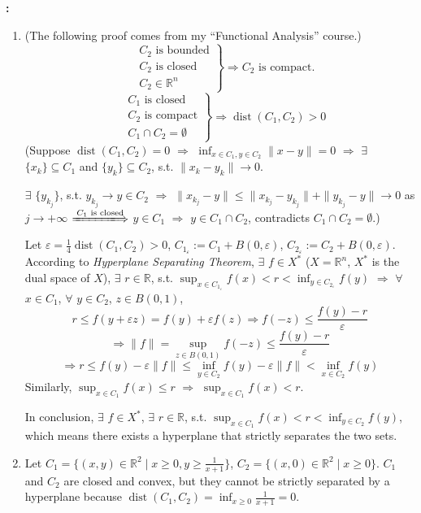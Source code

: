 \documentclass[11pt,letter,notitlepage]{article}
\theoremstyle{definition}
\begin{document}
\begin{solution}\textbf{:}
\begin{enumerate}
    \item[(a)] (The following proof comes from my ``Functional Analysis'' course.)
    $$
    \left.
    \begin{aligned}
        &C_2 \text{ is bounded}\\
        &C_2 \text{ is closed}\\
        &C_2 \in \mathbb{R}^n
    \end{aligned}
    \right\}
    \Longrightarrow
    C_2 \text{ is compact.}
    $$
    $$
    \left.
    \begin{aligned}
        &C_1 \text{ is closed}\\
        &C_2 \text{ is compact}\\
        &C_1 \cap C_2 = \emptyset
    \end{aligned}
    \right\}
    \Longrightarrow
    \operatorname{dist} (C_1, C_2) >0
    $$
    (Suppose $\operatorname{dist} (C_1, C_2) = 0$ $\Longrightarrow$ $\inf_{x \in C_1, y \in C_2} \|x-y\| = 0$ $\Longrightarrow$ $\exists$ $\{x_k\} \subseteq C_1$ and $\{y_k\} \subseteq C_2$, s.t. $\|x_k - y_k\| \to 0$.
    
    $\exists$ $\{y_{k_j}\}$, s.t. $y_{k_j} \to y \in C_2$ $\Longrightarrow$ $\|x_{k_j} - y\| \leq \|x_{k_j} - y_{k_j}\| + \|y_{k_j} - y\| \to 0$ as $j \to +\infty$ $\xLongrightarrow{C_1 \text{ is closed}}$ $y \in C_1$ $\Longrightarrow$ $y \in C_1 \cap C_2$, contradicts $C_1 \cap C_2 = \emptyset$.)

    Let $\varepsilon = \frac{1}{4} \operatorname{dist} (C_1, C_2) > 0$, $C_{1_\varepsilon} := C_1 + B(0, \varepsilon)$, $C_{2_\varepsilon} := C_2 + B(0, \varepsilon)$. According to \textit{Hyperplane Separating Theorem}, $\exists$ $f \in X^*$ ($X = \mathbb{R}^n$, $X^*$ is the dual space of $X$), $\exists$ $r \in \mathbb{R}$, s.t. $\sup_{x \in C_{1_\varepsilon}} f(x) < r < \inf_{y \in C_{2_\varepsilon}} f(y)$ $\Longrightarrow$ $\forall$ $x \in C_1$, $\forall$ $y \in C_2$, $z \in B(0,1)$, 
    $$
    r \leq f(y+\varepsilon z) = f(y) + \varepsilon f(z) \Longrightarrow f(-z) \leq \frac{f(y) - r}{\varepsilon}
    $$
    $$
    \Longrightarrow
    \|f\|
    =
    \sup_{z \in B(0,1)} f(-z) \leq \frac{f(y) - r}{\varepsilon}
    $$
    $$
    \Longrightarrow
    r \leq f(y) - \varepsilon \|f\|
    \leq
    \inf_{y \in C_2} f(y) - \varepsilon \|f\|
    <
    \inf_{x \in C_2} f(y)
    $$
    Similarly, $\sup_{x \in C_1} f(x) \leq r$ $\Longrightarrow$ $\sup_{x \in C_1} f(x) <r$.

    In conclusion, $\exists$ $f \in X^*$, $\exists$ $r \in \mathbb{R}$, s.t. $\sup_{x \in C_1} f(x) < r < \inf_{y \in C_2} f(y)$, which means there exists a hyperplane that strictly separates the two sets.
    \item[(b)]
    Let $C_1 = \{(x,y) \in \mathbb{R}^2 \mid x \geq 0, y \geq \frac{1}{x+1}\}$, $C_2 = \{(x,0) \in \mathbb{R}^2 \mid x \geq 0\}$. $C_1$ and $C_2$ are closed and convex, but they cannot be strictly separated by a hyperplane because $\operatorname{dist} (C_1, C_2) = \inf_{x \geq 0} \frac{1}{x+1} = 0$.
\end{enumerate}
\end{solution}
\end{document}
